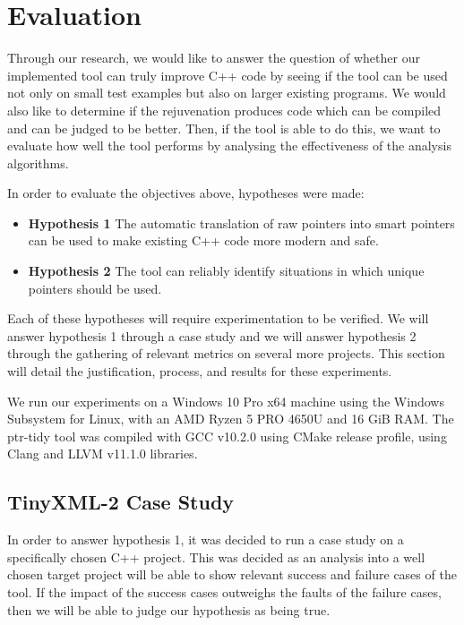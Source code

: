 \documentclass{mpaper}
\begin{document}


    \section{Evaluation}\label{sec:evaluation}
    
    Through our research, we would like to answer the question of whether our implemented tool can truly improve C++ code by seeing if the tool can be used not only on small test examples but also on larger existing programs. We would also like to determine if the rejuvenation produces code which can be compiled and can be judged to be better.
    Then, if the tool is able to do this, we want to evaluate how well the tool performs by analysing the effectiveness of the analysis algorithms.

    In order to evaluate the objectives above, hypotheses were made:
    
    \begin{itemize}
        \item \textbf{Hypothesis 1} The automatic translation of raw pointers into smart pointers can be used to make existing C++ code more modern and safe.
        \item \textbf{Hypothesis 2} The tool can reliably identify situations in which unique pointers should be used.
    \end{itemize}
    
    Each of these hypotheses will require experimentation to be verified.
    We will answer hypothesis 1 through a case study and we will answer hypothesis 2 through the gathering of relevant metrics on several more projects.
    This section will detail the justification, process, and results for these experiments.
    
    We run our experiments on a Windows 10 Pro x64 machine using the Windows Subsystem for Linux, with an AMD Ryzen 5 PRO 4650U and 16 GiB RAM.
    The ptr-tidy tool was compiled with GCC v10.2.0 using CMake release profile, using Clang and LLVM v11.1.0 libraries.

    \subsection{TinyXML-2 Case Study}\label{subsec:case-study}
    
    In order to answer hypothesis 1, it was decided to run a case study on a specifically chosen C++ project.
    This was decided as an analysis into a well chosen target project will be able to show relevant success and failure cases of the tool.
    If the impact of the success cases outweighs the faults of the failure cases, then we will be able to judge our hypothesis as being true.
    
\end{document}
